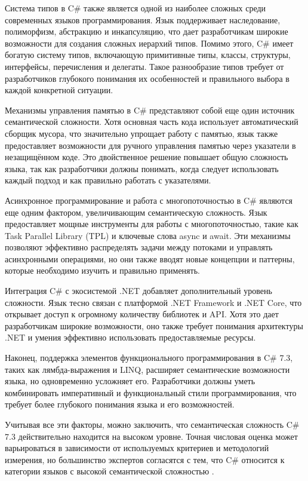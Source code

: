 \documentclass[a4paper, 12pt]{article}
\begin{document}
Система типов в C\# также является одной из наиболее сложных среди современных языков программирования. Язык поддерживает наследование, полиморфизм, абстракцию и инкапсуляцию, что дает разработчикам широкие возможности для создания сложных иерархий типов. Помимо этого, C\# имеет богатую систему типов, включающую примитивные типы, классы, структуры, интерфейсы, перечисления и делегаты. Такое разнообразие типов требует от разработчиков глубокого понимания их особенностей и правильного выбора в каждой конкретной ситуации.

Механизмы управления памятью в C\# представляют собой еще один источник семантической сложности. Хотя основная часть кода использует автоматический сборщик мусора, что значительно упрощает работу с памятью, язык также предоставляет возможности для ручного управления памятью через указатели в незащищённом коде. Это двойственное решение повышает общую сложность языка, так как разработчики должны понимать, когда следует использовать каждый подход и как правильно работать с указателями.

Асинхронное программирование и работа с многопоточностью в C\# являются еще одним фактором, увеличивающим семантическую сложность. Язык предоставляет мощные инструменты для работы с многопоточностью, такие как Task Parallel Library (TPL) и ключевые слова async и await. Эти механизмы позволяют эффективно распределять задачи между потоками и управлять асинхронными операциями, но они также вводят новые концепции и паттерны, которые необходимо изучить и правильно применять.

Интеграция C\# с экосистемой .NET добавляет дополнительный уровень сложности. Язык тесно связан с платформой .NET Framework и .NET Core, что открывает доступ к огромному количеству библиотек и API. Хотя это дает разработчикам широкие возможности, оно также требует понимания архитектуры .NET и умения эффективно использовать предоставляемые ресурсы.

Наконец, поддержка элементов функционального программирования в C\# 7.3, таких как лямбда-выражения и LINQ, расширяет семантические возможности языка, но одновременно усложняет его. Разработчики должны уметь комбинировать императивный и функциональный стили программирования, что требует более глубокого понимания языка и его возможностей.

Учитывая все эти факторы, можно заключить, что семантическая сложность C\# 7.3 действительно находится на высоком уровне. Точная числовая оценка может варьироваться в зависимости от используемых критериев и методологий измерения, но большинство экспертов согласятся с тем, что C\# относится к категории языков с высокой семантической сложностью  \cite{csharp_semantics_paper}.
\end{document}
